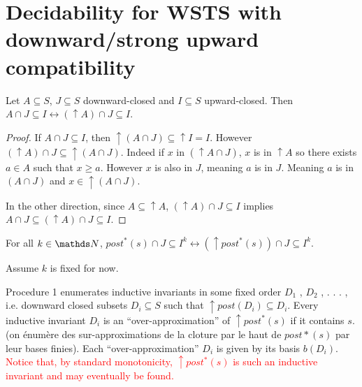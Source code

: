 
\section{Decidability for WSTS with downward/strong upward compatibility}



\begin{lemma}
Let $A \subseteq S$, $J \subseteq S$ downward-closed and $I \subseteq S$ upward-closed. 
Then $A \cap J \subseteq I \leftrightarrow (\uparrow  A) \cap J \subseteq I$.
\end{lemma}


\begin{proof}

If 
$A \cap J \subseteq I$,
then
${\uparrow (A \cap J)} \subseteq {\uparrow I} = I$.
However
$({\uparrow A}) \cap J \subseteq {\uparrow (A \cap J)}$.
Indeed if $x$ in $({\uparrow A} \cap J)$,
$x$ is in $\uparrow A$
so there exists $a \in A$ such that $x \geq a$.
However $x$ is also in $J$, meaning $a$ is in $J$.
Meaning $a$ is in $(A \cap J)$
and $x \in { \uparrow (A \cap J)}$.

In the other direction,
since $A \subseteq {\uparrow A}$,
$({\uparrow  A}) \cap J \subseteq I$ implies
$A \cap J \subseteq ({\uparrow  A}) \cap J \subseteq I$.
\end{proof}


\begin{corollary}
For all $k \in \N$,
$ post^*(s)\cap J \subseteq I^k \leftrightarrow (\uparrow  post^*(s)) \cap J \subseteq I^k$. 
\end{corollary}




Assume $k$ is fixed for now.

Procedure 1 enumerates inductive invariants in some fixed order $D_1$ , $D_2$ , . . . , i.e. downward closed subsets $D_i \subseteq S$ such that $\uparrow post(D_i ) \subseteq D_i$. 
Every inductive invariant $D_i$ is an “over-approximation” of $\uparrow post^*(s)$ if it contains $s$.
(on énumère des sur-approximations de la cloture par le haut de $post*(s)$ par leur bases finies).
Each “over-approximation” $D_i$ is given by its basis $b(D_i)$. \textcolor{red}{Notice that, by standard monotonicity, $\uparrow post^*(s)$ is such an inductive invariant and may
eventually be found.}

